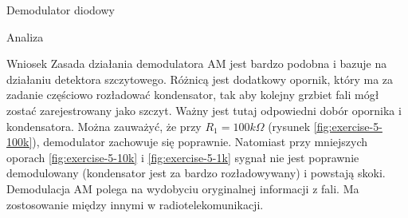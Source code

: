 \documentclass[a4paper]{scrartcl}
\begin{document}
\begin{section}{Demodulator diodowy}
\begin{subsection}{Analiza}
		\end{subsection}
		\clearpage
		\begin{subsection}{Wniosek}
			Zasada działania demodulatora AM jest bardzo podobna i bazuje na działaniu detektora szczytowego. Różnicą jest dodatkowy opornik, który ma za zadanie częściowo rozładować kondensator, tak aby kolejny grzbiet fali mógł zostać zarejestrowany jako szczyt. Ważny jest tutaj odpowiedni dobór opornika i kondensatora. Można zauważyć, że przy $R_{1} = 100k\Omega$ (rysunek \ref{fig:exercise-5-100k}), demodulator zachowuje się poprawnie. Natomiast przy mniejszych oporach \ref{fig:exercise-5-10k} i \ref{fig:exercise-5-1k} sygnał nie jest poprawnie demodulowany (kondensator jest za bardzo rozładowywany) i powstają skoki. Demodulacja AM polega na wydobyciu oryginalnej informacji z fali. Ma zostosowanie między innymi w radiotelekomunikacji.
		\end{subsection}
	\end{section}
\end{document}

